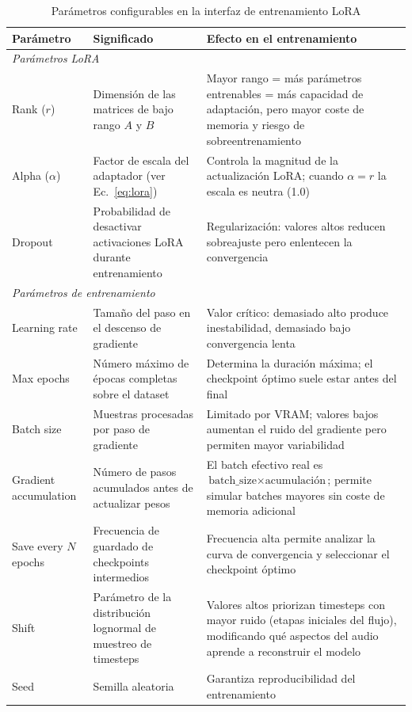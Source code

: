 \documentclass[%
    school=etsisi,%
    type=pfg,%
    degree=61CD,%
]{upm-report}
\begin{document}
\begin{table}[H]
    \centering
    \caption{Par\'ametros configurables en la interfaz de entrenamiento LoRA}
    \label{tab:params-ui}
    \small
    \begin{tabular}{lp{3.8cm}p{5cm}}
        \toprule
        \textbf{Par\'ametro} & \textbf{Significado} & \textbf{Efecto en el entrenamiento} \\
        \midrule
        \multicolumn{3}{l}{\textit{Par\'ametros LoRA}} \\
        \midrule
        Rank ($r$) & Dimensi\'on de las matrices de bajo rango $A$ y $B$ & Mayor rango = m\'as par\'ametros entrenables = m\'as capacidad de adaptaci\'on, pero mayor coste de memoria y riesgo de sobreentrenamiento \\
        Alpha ($\alpha$) & Factor de escala del adaptador (ver Ec.~\ref{eq:lora}) & Controla la magnitud de la actualizaci\'on LoRA; cuando $\alpha = r$ la escala es neutra (1.0) \\
        Dropout & Probabilidad de desactivar activaciones LoRA durante entrenamiento & Regularizaci\'on: valores altos reducen sobreajuste pero enlentecen la convergencia \\
        \midrule
        \multicolumn{3}{l}{\textit{Par\'ametros de entrenamiento}} \\
        \midrule
        Learning rate & Tama\~no del paso en el descenso de gradiente & Valor cr\'itico: demasiado alto produce inestabilidad, demasiado bajo convergencia lenta \\
        Max epochs & N\'umero m\'aximo de \'epocas completas sobre el dataset & Determina la duraci\'on m\'axima; el checkpoint \'optimo suele estar antes del final \\
        Batch size & Muestras procesadas por paso de gradiente & Limitado por VRAM; valores bajos aumentan el ruido del gradiente pero permiten mayor variabilidad \\
        Gradient accumulation & N\'umero de pasos acumulados antes de actualizar pesos & El batch efectivo real es $\text{batch\_size} \times \text{acumulaci\'on}$; permite simular batches mayores sin coste de memoria adicional \\
        Save every $N$ epochs & Frecuencia de guardado de checkpoints intermedios & Frecuencia alta permite analizar la curva de convergencia y seleccionar el checkpoint \'optimo \\
        Shift & Par\'ametro de la distribuci\'on lognormal de muestreo de timesteps & Valores altos priorizan timesteps con mayor ruido (etapas iniciales del flujo), modificando qu\'e aspectos del audio aprende a reconstruir el modelo \\
        Seed & Semilla aleatoria & Garantiza reproducibilidad del entrenamiento \\
        \bottomrule
    \end{tabular}
\end{table}
\end{document}
